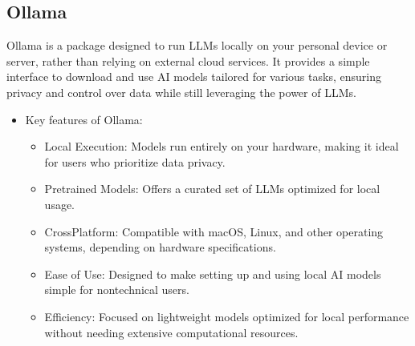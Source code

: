 \documentclass[letterpaper,11pt,english]{sphinxmanual}
\begin{document}
\subsection{Ollama}
\label{\detokenize{prelim:ollama}}
\sphinxAtStartPar
Ollama is a package designed to run LLMs locally on your personal device or
server, rather than relying on external cloud services. It provides a simple
interface to download and use AI models tailored for various tasks, ensuring
privacy and control over data while still leveraging the power of LLMs.
\begin{itemize}
\item {} 
\sphinxAtStartPar
Key features of Ollama:
\begin{itemize}
\item {} 
\sphinxAtStartPar
Local Execution: Models run entirely on your hardware, making it ideal for users who prioritize data privacy.

\item {} 
\sphinxAtStartPar
Pre\sphinxhyphen{}trained Models: Offers a curated set of LLMs optimized for local usage.

\item {} 
\sphinxAtStartPar
Cross\sphinxhyphen{}Platform: Compatible with macOS, Linux, and other operating systems, depending on hardware specifications.

\item {} 
\sphinxAtStartPar
Ease of Use: Designed to make setting up and using local AI models simple for non\sphinxhyphen{}technical users.

\item {} 
\sphinxAtStartPar
Efficiency: Focused on lightweight models optimized for local performance without needing extensive computational resources.

\end{itemize}

\end{itemize}
\end{document}
